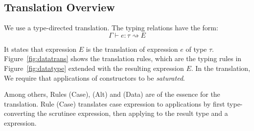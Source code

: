 \subsection{Translation Overview}

We use a type-directed translation. The typing relations have the form: \[\Gamma \vdash e : \tau \rightsquigarrow E \]

It states that \name expression $E$ is the translation of \sufcc expression $e$ of type $\tau$. Figure~\ref{fig:datatrans} shows the translation rules, which are the typing rules in Figure~\ref{fig:datatype} extended with the resulting expression $E$. In the translation, We require that applications of constructors to be \emph{saturated}.

Among others, Rules (Case), (Alt) and (Data) are of the essence for the translation. Rule (Case) translates case expression to applications by first type-converting the scrutinee expression, then applying to the result type and a \name expression.

